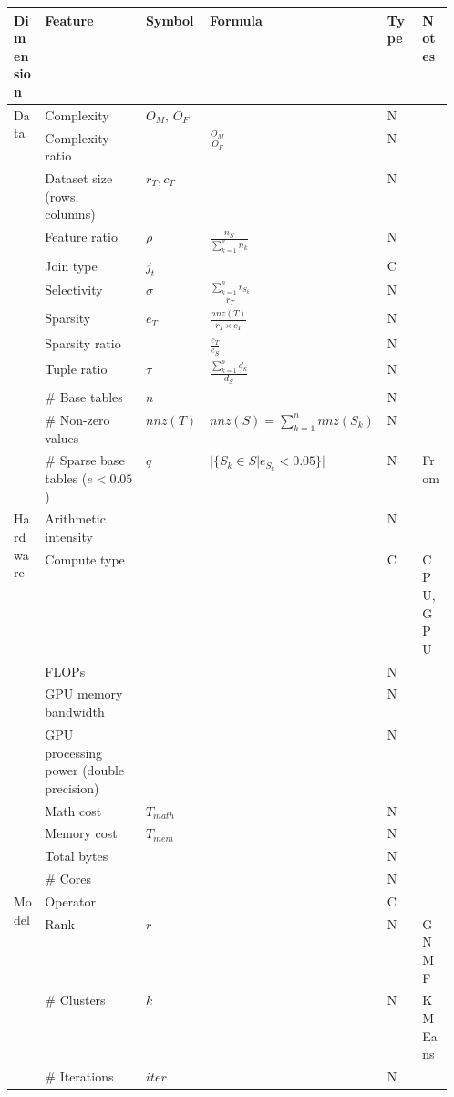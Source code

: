 \begin{tabular}{lp{0.23\linewidth}p{0.10\linewidth}>{\footnotesize}p{0.15\linewidth}p{0.08\linewidth}l}
\toprule
Dimension & Feature & Symbol & Formula & Type & Notes \\
\midrule\midrule
\multirow[t]{12}{*}{Data} & Complexity  & $O_M$, $O_F$ &  & N &  \\
 & Complexity ratio &  & $\frac{O_M}{ O_F}$ & N &  \\
 & Dataset size (rows, columns) & $r_T, c_T$ &  & N &  \\
 & Feature ratio & $\rho$ & $\frac{n_S}{\sum_{k=1}^p n_k} $ & N &  \\
 & Join type & $j_t$ &  & C &  \\
 & Selectivity & $\sigma$ & $\frac{\sum_{k=1}^{n}r_{S_k}}{r_T}$ & N &  \\
 & Sparsity & $e_T$ & $\frac{nnz(T)}{r_T\times c_T}$ & N &  \\
 & Sparsity ratio &  & $\frac{e_T}{e_S}$ & N &  \\
 & Tuple ratio & $\tau$ & $\frac{\sum_{k=1}^p d_k}{d_S}$ & N &  \\
 & \# Base tables & $n$ &  & N &  \\
 & \# Non-zero values & $nnz(T)$ & $nnz(S) = \sum_{k=1}^{n}nnz(S_k)$ & N &  \\
 & \# Sparse base tables ($e < 0.05$) & $q$ & $|\{S_k \in S| e_{S_k} < 0.05\}|$ & N & From \cite{MorpheusFI} \\

\multirow[t]{9}{*}{Hardware} & Arithmetic intensity &  &  & N &  \\
 & Compute type &  &  & C & CPU, GPU \\
 & FLOPs &  &  & N &  \\
 & GPU memory bandwidth &  &  & N &  \\
 & GPU processing power (double precision) &  &  & N &  \\
 & Math cost & $T_{math}$ &  & N &  \\
 & Memory cost & $T_{mem}$ &  & N &  \\
 & Total bytes &  &  & N &  \\
 & \# Cores &  &  & N &  \\

\multirow[t]{4}{*}{Model} & Operator &  &  & C &  \\
 & Rank & $r$ &  & N & GNMF \\
 & \# Clusters & $k$ &  & N & KMEans \\
 & \# Iterations & $iter$ &  & N &  \\

\bottomrule
\end{tabular}
